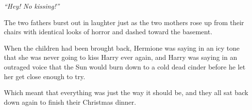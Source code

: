 \emph{``Hey! No kissing!''}

The two fathers burst out in laughter just as the two mothers rose up
from their chairs with identical looks of horror and dashed toward the
basement.

When the children had been brought back, Hermione was saying in an icy
tone that she was never going to kiss Harry ever again, and Harry was
saying in an outraged voice that the Sun would burn down to a cold dead
cinder before he let her get close enough to try.

Which meant that everything was just the way it should be, and they all
sat back down again to finish their Christmas dinner.
